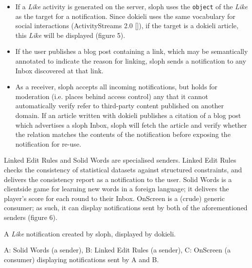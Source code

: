 \documentclass[a4paper]{llncs}
\begin{document}
                            \begin{itemize}
  \item If a {\em Like} activity is generated on the server, sloph uses the {\tt object} of the {\em Like} as the target for a notification. Since dokieli uses the same vocabulary for social interactions (\empty ActivityStreams 2.0 []), if the target is a dokieli article, this {\em Like} will be displayed (\empty figure 5).\item If the user publishes a blog post containing a link, which may be semantically annotated to indicate the reason for linking, sloph sends a notification to any Inbox discovered at that link.\item As a receiver, sloph accepts all incoming notifications, but holds for moderation (i.e. places behind access control) any that it cannot automatically verify refer to third-party content published on another domain. If an article written with dokieli publishes a citation of a blog post which advertises a sloph Inbox, sloph will fetch the article and verify whether the relation matches the contents of the notification before exposing the notification for re-use.
    \end{itemize}
  

                            
\par \empty Linked Edit Rules and \empty Solid Words are specialised senders. Linked Edit Rules checks the consistency of statistical datasets against structured constraints, and delivers the consistency report as a notification to the user. Solid Words is a clientside game for learning new words in a foreign language; it delivers the player’s score for each round to their Inbox. \empty OnScreen is a (crude) generic consumer; as such, it can display notifications sent by both of the aforementioned senders (\empty figure 6).

                            
                                
                                A {\em Like} notification created by sloph, displayed by dokieli.
                            

                            
                                
                                A: Solid Words (a sender), B: Linked Edit Rules (a sender), C: OnScreen (a consumer) displaying notifications sent by A and B.
                            
                        
                    
\end{document}
